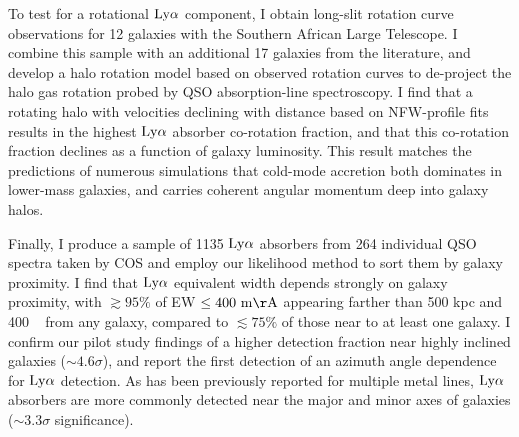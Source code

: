 To test for a rotational $\rm Ly\alpha$ component, I obtain long-slit rotation curve observations for 12 galaxies with the Southern African Large Telescope. I combine this sample with an additional 17 galaxies from the literature, and develop a halo rotation model based on observed rotation curves to de-project the halo gas rotation probed by QSO absorption-line spectroscopy. I find that a rotating halo with velocities declining with distance based on NFW-profile fits results in the highest $\rm Ly\alpha$ absorber co-rotation fraction, and that this co-rotation fraction declines as a function of galaxy luminosity. This result matches the predictions of numerous simulations that cold-mode accretion both dominates in lower-mass galaxies, and carries coherent angular momentum deep into galaxy halos.

Finally, I produce a sample of 1135 $\rm Ly\alpha$ absorbers from 264 individual QSO spectra taken by COS and employ our likelihood method to sort them by galaxy proximity. I find that $\rm Ly\alpha$ equivalent width depends strongly on galaxy proximity, with $\gtrsim 95\%$ of EW $\rm \leq 400~ m\AA$ appearing farther than 500 kpc and 400 \kms~ from any galaxy, compared to $\lesssim75\%$ of those near to at least one galaxy. I confirm our pilot study findings of a higher detection fraction near highly inclined galaxies ($\sim4.6 \sigma$), and report the first detection of an azimuth angle dependence for $\rm Ly\alpha$ detection. As has been previously reported for multiple metal lines, $\rm Ly\alpha$ absorbers are more commonly detected near the major and minor axes of galaxies ($\sim 3.3\sigma$ significance). 



